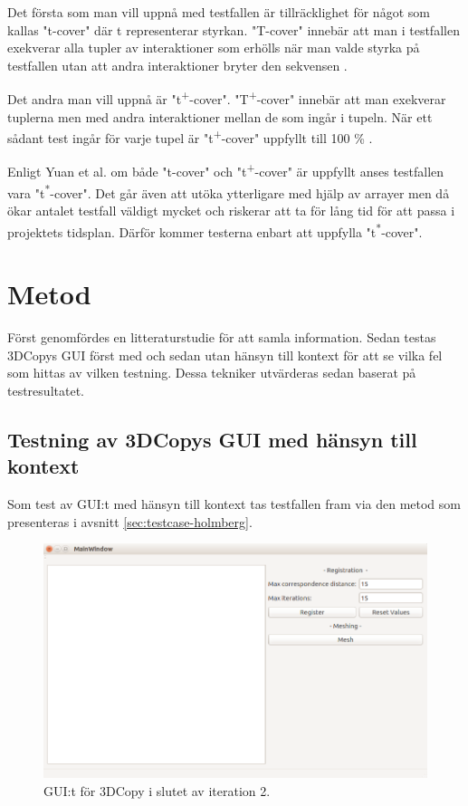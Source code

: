 Det första som man vill uppnå med testfallen är tillräcklighet för något som kallas "t-cover" där t representerar styrkan. "T-cover" innebär att man i testfallen exekverar alla tupler av interaktioner som erhölls när man valde styrka på testfallen utan att andra interaktioner bryter den sekvensen \cite{yuan2011gui}.

Det andra man vill uppnå är "t\textsuperscript{+}-cover". "T\textsuperscript{+}-cover" innebär att man exekverar tuplerna men med andra interaktioner mellan de som ingår i tupeln. När ett sådant test ingår för varje tupel är "t\textsuperscript{+}-cover" uppfyllt till 100 \% \cite{yuan2011gui}.

Enligt Yuan et al. \cite{yuan2011gui} om både "t-cover" och "t\textsuperscript{+}-cover" är uppfyllt anses testfallen vara "t\textsuperscript{*}-cover". Det går även att utöka ytterligare med hjälp av arrayer men då ökar antalet testfall väldigt mycket och riskerar att ta för lång tid för att passa i projektets tidsplan. Därför kommer testerna enbart att uppfylla "t\textsuperscript{*}-cover".

\section{Metod}
\label{sec:method-holmberg}

Först genomfördes en litteraturstudie för att samla information. Sedan testas 3DCopys GUI först med och sedan utan hänsyn till kontext för att se vilka fel som hittas av vilken testning. Dessa tekniker utvärderas sedan baserat på testresultatet.

\subsection{Testning av 3DCopys GUI med hänsyn till kontext}

Som test av GUI:t med hänsyn till kontext tas testfallen fram via den metod som presenteras i avsnitt \ref{sec:testcase-holmberg}.

\begin{figure}[H]
	\centering
	\includegraphics[width=130mm]{figures/3DCopyGUI.PNG}
	\caption{GUI:t för 3DCopy i slutet av iteration 2.}
	\label{fig:3dcopy_gui}
\end{figure}


